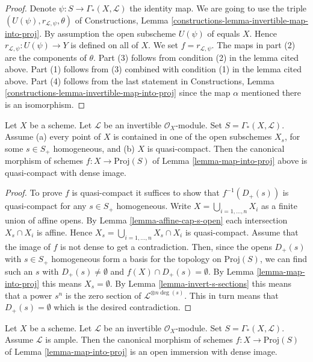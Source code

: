 \begin{proof}
Denote $\psi : S \to \Gamma_*(X, \mathcal{L})$ the identity map.
We are going to use the triple
$(U(\psi), r_{\mathcal{L}, \psi}, \theta)$ of
Constructions, Lemma \ref{constructions-lemma-invertible-map-into-proj}.
By assumption the open subscheme $U(\psi)$ of equals $X$. Hence
$r_{\mathcal{L}, \psi} : U(\psi) \to Y$ is defined on all of $X$.
We set $f = r_{\mathcal{L}, \psi}$.
The maps in part (2) are the components of $\theta$.
Part (3) follows from condition (2) in the lemma cited above.
Part (1) follows from (3) combined with condition (1) in the lemma
cited above. Part (4) follows from the last statement in
Constructions, Lemma \ref{constructions-lemma-invertible-map-into-proj}
since the map $\alpha$ mentioned there is an isomorphism.
\end{proof}

\begin{lemma}
\label{lemma-map-into-proj-quasi-compact}
Let $X$ be a scheme. Let $\mathcal{L}$ be an invertible $\mathcal{O}_X$-module.
Set $S = \Gamma_*(X, \mathcal{L})$.
Assume (a) every point of $X$ is contained in one of the
open subschemes $X_s$, for some $s \in S_{+}$ homogeneous,
and (b) $X$ is quasi-compact. Then the canonical morphism of schemes
$f : X \longrightarrow \text{Proj}(S)$ of Lemma \ref{lemma-map-into-proj}
above is quasi-compact with dense image.
\end{lemma}

\begin{proof}
To prove $f$ is quasi-compact it suffices to show that $f^{-1}(D_{+}(s))$
is quasi-compact for any $s \in S_{+}$ homogeneous. Write
$X = \bigcup_{i = 1, \ldots, n} X_i$ as a finite union of
affine opens. By Lemma \ref{lemma-affine-cap-s-open} each intersection
$X_s \cap X_i$ is affine. Hence $X_s = \bigcup_{i = 1, \ldots, n} X_s \cap X_i$
is quasi-compact. Assume that the image of $f$ is not dense to get
a contradiction. Then, since the opens $D_+(s)$ with $s \in S_+$ homogeneous
form a basis for the topology on $\text{Proj}(S)$, we can find such
an $s$ with $D_+(s) \not = \emptyset$ and $f(X) \cap D_+(s) = \emptyset$.
By Lemma \ref{lemma-map-into-proj}
this means $X_s = \emptyset$. By Lemma \ref{lemma-invert-s-sections}
this means that a power $s^n$ is the zero section of
$\mathcal{L}^{\otimes n\deg(s)}$.
This in turn means that $D_+(s) = \emptyset$ which is the
desired contradiction.
\end{proof}

\begin{lemma}
\label{lemma-ample-immersion-into-proj}
Let $X$ be a scheme. Let $\mathcal{L}$ be an invertible $\mathcal{O}_X$-module.
Set $S = \Gamma_*(X, \mathcal{L})$.
Assume $\mathcal{L}$ is ample. Then the canonical morphism of schemes
$f : X \longrightarrow \text{Proj}(S)$ of Lemma \ref{lemma-map-into-proj}
is an open immersion with dense image.
\end{lemma}

